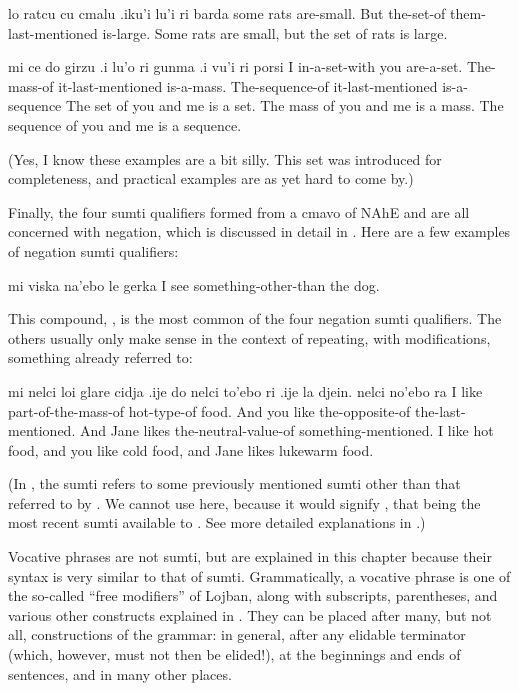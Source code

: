 \begin{example}
lo ratcu cu cmalu\n
\T	.iku'i lu'i ri barda\n
some rats are-small.\n
\T	But the-set-of them-last-mentioned is-large.\n
Some rats are small, but the set of rats is large.
\end{example}

\begin{example}
mi ce do girzu\n
\T	.i lu'o ri gunma\n
\T	.i vu'i ri porsi\n
I in-a-set-with you are-a-set.\n
\T	The-mass-of it-last-mentioned is-a-mass.\n
\T	The-sequence-of it-last-mentioned is-a-sequence\n
The set of you and me is a set.\n
\T	The mass of you and me is a mass.\n
\T	The sequence of you and me is a sequence.
\end{example}

(Yes, I know these examples are a bit silly. This set was
    introduced for completeness, and practical examples are as yet
    hard to come by.) 

Finally, the four sumti qualifiers formed from a cmavo of
    NAhE and  are all concerned with negation, which is
    discussed in detail in .
    Here are a few examples of negation sumti qualifiers:
\begin{example}
mi viska na'ebo le gerka\n
I see something-other-than the dog.
\end{example}

This compound, , is the most common of the four
    negation sumti qualifiers. The others usually only make sense
    in the context of repeating, with modifications, something
    already referred to:
\begin{example}
mi nelci loi glare cidja\n
\T	.ije do nelci\n
\T	to'ebo ri\n
\T	.ije la djein. nelci\n
\T	no'ebo ra\n
I like part-of-the-mass-of hot-type-of food.\n
\T	And you like\n
\T	the-opposite-of the-last-mentioned.\n
\T	And Jane likes\n
\T	the-neutral-value-of something-mentioned.\n
I like hot food, and you like cold food,\n
\T	and Jane likes lukewarm food.
\end{example}

(In , the sumti 
    refers to some previously mentioned sumti other than that
    referred to by . We cannot use  here, because it
    would signify , that being the most recent sumti
    available to . See more detailed explanations in .)



Vocative phrases are not sumti, but are explained in this
    chapter because their syntax is very similar to that of sumti.
    Grammatically, a vocative phrase is one of the so-called ``free
    modifiers'' of Lojban, along with subscripts, parentheses, and
    various other constructs explained in . They can be placed after
    many, but not all, constructions of the grammar: in general,
    after any elidable terminator (which, however, must not then be
    elided!), at the beginnings and ends of sentences, and in many
    other places.

